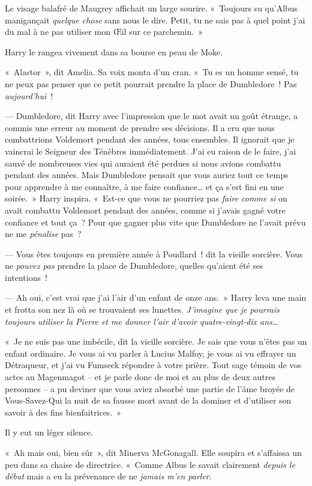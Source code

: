 Le visage balafré de Maugrey affichait un large sourire. «~Toujours su qu'Albus manigançait \emph{quelque chose} sans nous le dire. Petit, tu ne sais pas à quel point j'ai du mal à ne pas utiliser mon Œil sur ce parchemin.~»

Harry le rangea vivement dans sa bourse en peau de Moke.

«~Alastor~», dit Amelia. Sa voix monta d'un cran. «~Tu es un homme sensé, tu ne peux pas penser que ce petit pourrait prendre la place de Dumbledore~! Pas \emph{aujourd'hui}~!

--- Dumbledore, dit Harry avec l'impression que le mot avait un goût étrange, a commis une erreur au moment de prendre ses décisions. Il a cru que nous combattrions Voldemort pendant des années, tous ensembles. Il ignorait que je vaincrai le Seigneur des Ténèbres immédiatement. J'ai eu raison de le faire, j'ai sauvé de nombreuses vies qui auraient été perdues si nous avions combattu pendant des années. Mais Dumbledore pensait que vous auriez tout ce temps pour apprendre à me connaître, à me faire confiance… et ça s'est fini en une soirée.~» Harry inspira. «~Est-ce que vous ne pourriez pas \emph{faire comme si} on avait combattu Voldemort pendant des années, comme si j'avais gagné votre confiance et tout ça~? Pour que gagner plus vite que Dumbledore ne l'avait prévu ne me \emph{pénalise} pas~?

--- Vous êtes toujours en première année à Poudlard~! dit la vieille sorcière. Vous ne \emph{pouvez pas} prendre la place de Dumbledore, quelles qu'aient été ses intentions~!

--- Ah oui, c'est vrai que j'ai l'air d'un enfant de onze ans.~» Harry leva une main et frotta son nez là où se trouvaient ses lunettes. \emph{J'imagine que je pourrais toujours utiliser la Pierre et me donner l'air d'avoir quatre-vingt-dix ans…}

«~Je ne suis pas une imbécile, dit la vieille sorcière. Je sais que vous n'êtes pas un enfant ordinaire. Je vous ai vu parler à Lucius Malfoy, je vous ai vu effrayer un Détraqueur, et j'ai vu Fumseck répondre à votre prière. Tout sage témoin de vos actes au Magenmagot -- et je parle donc de moi et au plus de deux autres personnes -- a pu deviner que vous aviez absorbé une partie de l'âme broyée de Vous-Savez-Qui la nuit de sa fausse mort avant de la dominer et d'utiliser son savoir à des fins bienfaitrices.~»

Il y eut un léger silence.

«~Ah mais oui, bien sûr~», dit Minerva McGonagall. Elle soupira et s'affaissa un peu dans sa chaise de directrice. «~Comme Albus le savait clairement \emph{depuis le début} mais a eu la prévenance de ne \emph{jamais m'en parler}.

